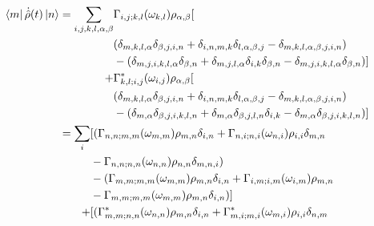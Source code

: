 \begin{align}
    \bra{m}\dot{\hat{\rho}}(t) \ket{n} & = \begin{aligned}[t]
        \sum_{i,j,k, l, \alpha, \beta} &
        \Gamma_{i,j;k, l}(\omega_{k,l})
        \rho_{\alpha, \beta} [                             \\
                                       &
            (\delta_{m, k, l, \alpha}\delta_{\beta, j,i, n}
            + \delta_{i, n, m, k}\delta_{l, \alpha, \beta, j}
        - \delta_{m, k, l, \alpha, \beta, j,i, n})         \\
                                       &
            - (    \delta_{m, j,i, k,l, \alpha}\delta_{\beta, n}
            + \delta_{m, j,l, \alpha}\delta_{i, k}\delta_{\beta, n}
        - \delta_{m, j,i, k, l, \alpha}\delta_{\beta, n})] \\
        +                              &
        \Gamma^*_{k, l; i,j}(\omega_{i,j})
        \rho_{\alpha, \beta} [                             \\
                                       &
            (\delta_{m, k, l, \alpha}\delta_{\beta, j,i, n}
            + \delta_{i, n, m, k}\delta_{l, \alpha, \beta, j}
        - \delta_{m, k, l, \alpha, \beta, j,i, n})         \\
                                       &
            - (\delta_{m, \alpha}\delta_{\beta, j,i, k, l, n}
            + \delta_{m, \alpha}\delta_{\beta, j,l, n}
            \delta_{i, k}
            - \delta_{m, \alpha}\delta_{\beta, j,i, k,l, n})]
    \end{aligned}  \\
                                       & = \begin{aligned}[t]
        \sum_{i} &
        [ (\Gamma_{n,n;m, m}(\omega_{m,m})\rho_{m, n}\delta_{i,n}
        + \Gamma_{n,i;n, i}(\omega_{n,i})\rho_{i, i}\delta_{m,n}     \\ &
        - \Gamma_{n,n;n,n}(\omega_{n,n})\rho_{n,n}\delta_{m,n,i})    \\
                 &
                - (\Gamma_{m,m;m,m}(\omega_{m,m})\rho_{m, n}\delta_{i,n}
        +\Gamma_{i,m;i, m}(\omega_{i,m})\rho_{m, n}                  \\ &
        -\Gamma_{m,m;m,m}(\omega_{m,m})\rho_{m, n}\delta_{i,n})]     \\
        +        &
        [(\Gamma^*_{m,m; n,n}(\omega_{n,n})\rho_{m, n}\delta_{i,n}
        + \Gamma^*_{m,i; m,i}(\omega_{m,i})\rho_{i, i}\delta_{n, m}  \\ &

\end{aligned}
\end{align}
